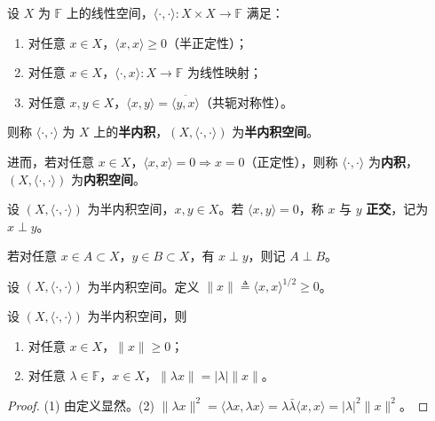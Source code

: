 \documentclass[lang=cn,a4paper,newtx,section]{elegantbook}
\begin{document}
\begin{definition}
  设 $X$ 为 $\mathbb{F}$ 上的线性空间，$\langle\cdot,\cdot\rangle:X\times X\to\mathbb{F}$ 满足：
  \begin{enumerate}
    \item 对任意 $x\in X$，$\langle x,x\rangle\ge 0$（半正定性）；
    \item 对任意 $x\in X$，$\langle\cdot,x\rangle:X\to\mathbb{F}$ 为线性映射；
    \item 对任意 $x,y\in X$，$\langle x,y\rangle=\overline{\langle y,x\rangle}$（共轭对称性）。
  \end{enumerate}
  则称 $\langle\cdot,\cdot\rangle$ 为 $X$ 上的\textbf{半内积}，$(X,\langle\cdot,\cdot\rangle)$ 为\textbf{半内积空间}。

  进而，若对任意 $x\in X$，$\langle x,x\rangle=0\Rightarrow x=0$（正定性），则称 $\langle\cdot,\cdot\rangle$ 为\textbf{内积}，$(X,\langle\cdot,\cdot\rangle)$ 为\textbf{内积空间}。
\end{definition}

\begin{definition}[正交]
  设 $(X,\langle\cdot,\cdot\rangle)$ 为半内积空间，$x,y\in X$。若 $\langle x,y\rangle=0$，称 $x$ 与 $y$ \textbf{正交}，记为 $x\perp y$。

  若对任意 $x\in A\subset X$，$y\in B\subset X$，有 $x\perp y$，则记 $A\perp B$。
\end{definition}

\begin{definition}[范数]
  设 $(X,\langle\cdot,\cdot\rangle)$ 为半内积空间。定义 $\|x\|\triangleq\langle x,x\rangle^{1/2}\ge 0$。
\end{definition}

\begin{proposition}
  设 $(X,\langle\cdot,\cdot\rangle)$ 为半内积空间，则
  \begin{enumerate}
    \item 对任意 $x\in X$，$\|x\|\ge 0$；
    \item 对任意 $\lambda\in\mathbb{F}$，$x\in X$，$\|\lambda x\|=|\lambda|\|x\|$。
  \end{enumerate}
\end{proposition}

\begin{proof}
  (1) 由定义显然。(2) $\|\lambda x\|^2=\langle\lambda x,\lambda x\rangle=\lambda\bar{\lambda}\langle x,x\rangle=|\lambda|^2\|x\|^2$。
\end{proof}
\end{document}
